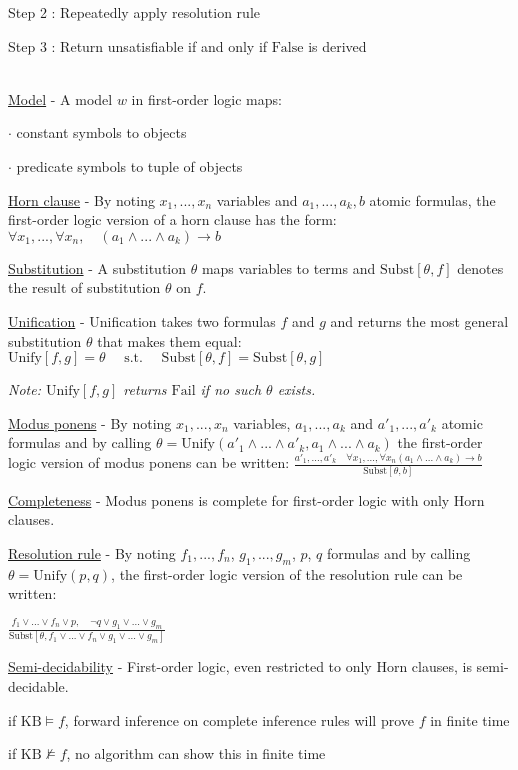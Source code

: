 \documentclass[4pt,landscape]{article}
\begin{document}
\begin{multicols*}{4}
 {\textrm{Step 2} : Repeatedly apply resolution rule}\par
 {\textrm{Step 3} : Return unsatisfiable if and only if $\text{False}$ is derived}\par
 {\color{yellow} \hrulefill}\\
 {\tiny \underline{Model} - A model $w$ in first-order logic maps:}\par
 {\tiny $\cdot$ constant symbols to objects}\par
 {\tiny $\cdot$ predicate symbols to tuple of objects}\par
 {\tiny \underline{Horn clause} - By noting $x_1,...,x_n$ variables and $a_1,...,a_k,b$ atomic formulas, the first-order logic version of a horn clause has the form: \\$\forall x_1,...,\forall x_n,\quad(a_1\wedge...\wedge a_k)\rightarrow b$}\par
 {\tiny \underline{Substitution} - A substitution $\theta$ maps variables to terms and $\textrm{Subst}[\theta,f]$ denotes the result of substitution $\theta$ on $f$.}\par
 {\tiny \underline{Unification} - Unification takes two formulas $f$ and $g$ and returns the most general substitution $\theta$ that makes them equal: $\textrm{Unify}[f,g]=\theta\quad\textrm{ s.t. }\quad \textrm{Subst}[\theta,f]=\textrm{Subst}[\theta,g]$}\par
 {\tiny \textit{Note: $\textrm{Unify}[f,g]$ returns $\textrm{Fail}$ if no such $\theta$ exists.}}\par
 {\tiny \underline{Modus ponens} - By noting $x_1,...,x_n$ variables, $a_1, ..., a_k$ and $a'_1,...,a'_k$ atomic formulas and by calling $\theta = \textrm{Unify}(a'_1\wedge ...\wedge a'_k, a_1\wedge ...\wedge a_k)$ the first-order logic version of modus ponens can be written: $\frac{a'_1,...,a'_k\quad\forall x_1,...,\forall x_n (a_1\wedge...\wedge a_k)\rightarrow b}{\textrm{Subst}[\theta, b]}$}\par
 {\tiny \underline{Completeness} - Modus ponens is complete for first-order logic with only Horn clauses.}\par
 {\tiny \underline{Resolution rule} - By noting $f_1, ..., f_n$, $g_1, ..., g_m$, $p$, $q$ formulas and by calling $\theta=\textrm{Unify}(p,q)$, the first-order logic version of the resolution rule can be written:}\par
 {$\frac{f_1\vee...\vee f_n\vee p,\quad\neg q\vee g_1\vee...\vee g_m}{\textrm{Subst}[\theta,f_1\vee...\vee f_n\vee g_1\vee...\vee g_m]}$}\par
 {\tiny \underline{Semi-decidability} - First-order logic, even restricted to only Horn clauses, is semi-decidable.}\par
 {\tiny if $\textrm{KB}\models f$, forward inference on complete inference rules will prove $f$ in finite time}\par
 {\tiny if $\textrm{KB}\not\models f$, no algorithm can show this in finite time}\par
 

\end{multicols*}
\end{document}
